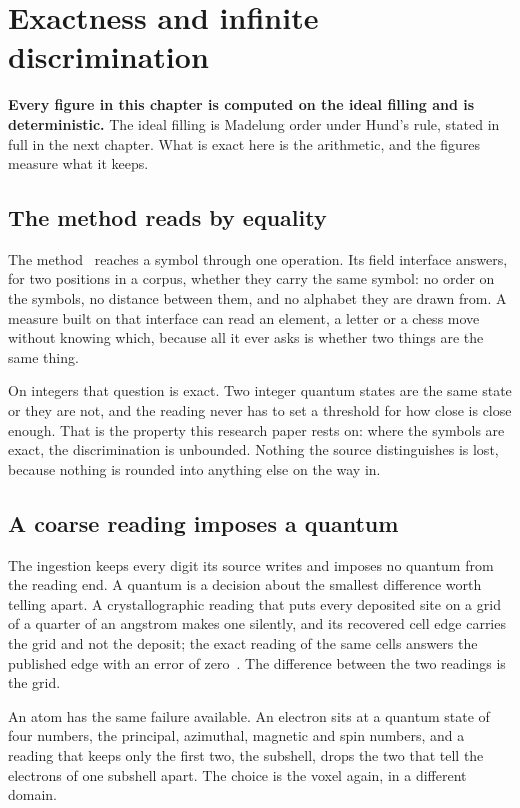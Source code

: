 \chapter{Exactness and infinite discrimination}

\textbf{Every figure in this chapter is computed on the ideal filling and is deterministic.} The ideal
filling is Madelung order under Hund's rule, stated in full in the next chapter. What is exact here is
the arithmetic, and the figures measure what it keeps.

\section{The method reads by equality}

The method~\cite{src:Quigg-orior-workbook} reaches a symbol through one operation. Its field
interface answers, for two positions in a corpus, whether they carry the same symbol: no order on the
symbols, no distance between them, and no alphabet they are drawn from. A measure built on that
interface can read an element, a letter or a chess move without knowing which, because all it ever
asks is whether two things are the same thing.

On integers that question is exact. Two integer quantum states are the same state or they are not,
and the reading never has to set a threshold for how close is close enough. That is the property this
research paper rests on: where the symbols are exact, the discrimination is unbounded. Nothing the
source distinguishes is lost, because nothing is rounded into anything else on the way in.

\section{A coarse reading imposes a quantum}

The ingestion keeps every digit its source writes and imposes no quantum from the reading end. A
quantum is a decision about the smallest difference worth telling apart. A crystallographic reading
that puts every deposited site on a grid of a quarter of an angstrom makes one silently, and its
recovered cell edge carries the grid and not the deposit; the exact reading of the same cells answers
the published edge with an error of zero~\cite{src:Quigg-crystallography}. The difference between
the two readings is the grid.

An atom has the same failure available. An electron sits at a quantum state of four numbers, the
principal, azimuthal, magnetic and spin numbers, and a reading that keeps only the first two, the
subshell, drops the two that tell the electrons of one subshell apart. The choice is the voxel again,
in a different domain.

